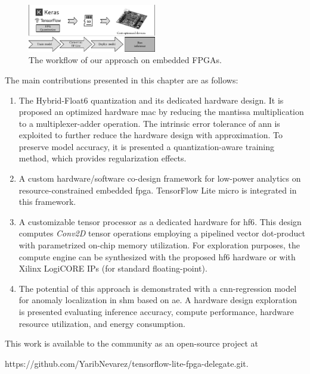 \begin{figure}[t!]
	\centering
	\includegraphics[width=0.5\textwidth]{./chapters/cnn_accelerator/figures/workflow.pdf}
	\caption{The workflow of our approach on embedded FPGAs.}
	\label{fig:workflow}
\end{figure}

The main contributions presented in this chapter are as follows:
\begin{enumerate}
	\item
	
	The Hybrid-Float6 quantization and its dedicated hardware design. It is proposed an optimized hardware \gls{mac} by reducing the mantissa multiplication to a multiplexer-adder operation. The intrinsic error tolerance of \gls{ann} is exploited to further reduce the hardware design with approximation. To preserve model accuracy, it is presented a quantization-aware training method, which provides regularization effects.
	
	\item A custom hardware/software co-design framework for low-power analytics on resource-constrained embedded \gls{fpga}. TensorFlow Lite micro is integrated in this framework.
	\item A customizable tensor processor as a dedicated hardware for \gls{hf6}. This design computes \emph{Conv2D} tensor operations employing a pipelined vector dot-product with parametrized on-chip memory utilization. For exploration purposes, the compute engine can be synthesized with the proposed \gls{hf6} hardware or with Xilinx LogiCORE IPs (for standard floating-point).
	\item The potential of this approach is demonstrated with a \gls{cnn}-regression model for anomaly localization in \gls{shm} based on \gls{ae}. A hardware design exploration is presented evaluating inference accuracy, compute performance, hardware resource utilization, and energy consumption.
\end{enumerate}

This work is available to the community as an open-source project at

https://github.com/YaribNevarez/tensorflow-lite-fpga-delegate.git.